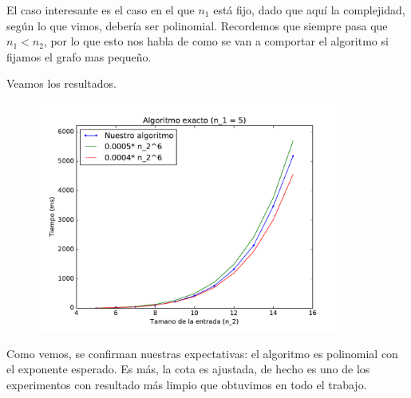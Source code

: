 El caso interesante es el caso en el que $n_1$ está fijo, dado que aquí la complejidad, según lo que vimos, debería ser polinomial. Recordemos que siempre pasa que $n_1 < n_2$, por lo que esto nos habla de como se van a comportar el algoritmo si fijamos el grafo mas pequeño.

Veamos los resultados.


\begin{figure}[H]
 \centering
	\includegraphics[width=0.9\textwidth]{graficos/problema_2/tiempos_2.pdf}
	\caption{}
	\label{fig:problema2-2}
\end{figure}

Como vemos, se confirman nuestras expectativas: el algoritmo es polinomial con el exponente esperado.
Es más, la cota es ajustada, de hecho es uno de los experimentos con resultado más limpio que obtuvimos en todo el trabajo.


